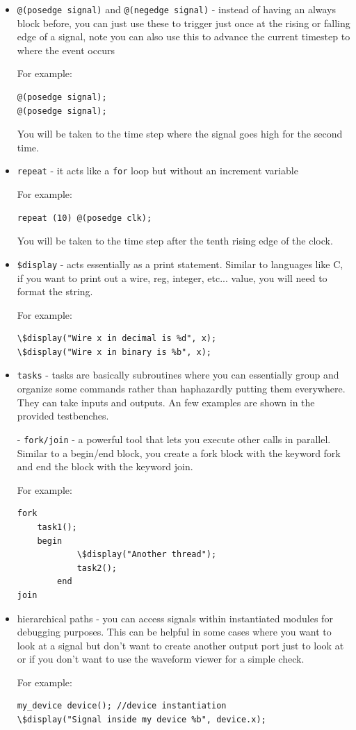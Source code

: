 \documentclass[11pt]{article}
\begin{document}
\begin{itemize}
\item \verb|@(posedge signal)| and \verb|@(negedge signal)| - instead of having an always block before, you can just use these to trigger just once at the rising or falling edge of a signal, note you can also use this to advance the current timestep to where the event occurs

For example:
\begin{verbatim}
@(posedge signal);
@(posedge signal);
\end{verbatim} 

You will be taken to the time step where the signal goes high for the second time.

\item \verb|repeat| - it acts like a \verb|for| loop but without an increment variable

For example:
\begin{verbatim}
repeat (10) @(posedge clk);
\end{verbatim} 

You will be taken to the time step after the tenth rising edge of the clock.

\item \verb|$display| - acts essentially as a print statement. Similar to languages like C, if you want to print out a wire, reg, integer, etc... value, you will need to format the string.

For example:
\begin{verbatim}
\$display("Wire x in decimal is %d", x);
\$display("Wire x in binary is %b", x);
\end{verbatim} 

\item \verb|tasks| - tasks are basically subroutines where you can essentially group and organize some commands rather than haphazardly putting them everywhere. They can take inputs and outputs. An few examples are shown in the provided testbenches.

- \verb|fork/join| - a powerful tool that lets you execute other calls in parallel. Similar to a begin/end block, you create a fork block with the keyword fork and end the block with the keyword join. 

For example:
\begin{verbatim}
fork
    task1();
    begin
    	    \$display("Another thread");
    	    task2();
    	end
join
\end{verbatim} 

\item hierarchical paths - you can access signals within instantiated modules for debugging purposes. This can be helpful in some cases where you want to look at a signal but don't want to create another output port just to look at or if you don't want to use the waveform viewer for a simple check.

For example:
\begin{verbatim}
my_device device(); //device instantiation
\$display("Signal inside my device %b", device.x);
\end{verbatim} 
\end{itemize}
\end{document}
